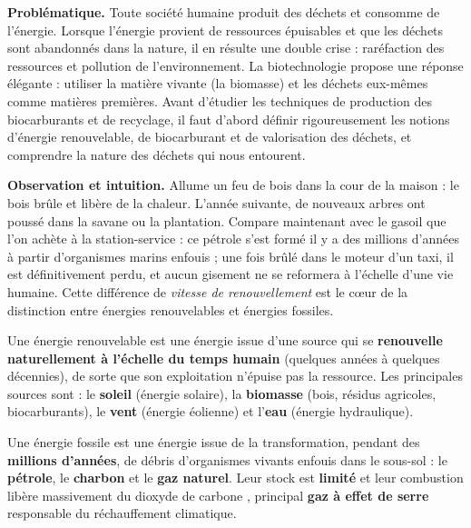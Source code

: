 \documentclass[11pt]{article}
\newcommand{\cle}[1]{{\popxbold\color{popdark}#1}}
\newcounter{popsec}
\newcounter{popsub}
\newcommand{\courssub}[1]{%
  \stepcounter{popsub}%
  \par\vspace{9pt}\noindent{\popxbold\fontsize{11.5}{13}\selectfont\color{popink}{\color{poporange}\thepopsec.\thepopsub}\hspace{6pt}#1}\par\nopagebreak\vspace{4pt}
}
\begin{document}
\textbf{Problématique.} Toute société humaine produit des déchets et consomme de l'énergie. Lorsque l'énergie provient de ressources épuisables et que les déchets sont abandonnés dans la nature, il en résulte une double crise : raréfaction des ressources et pollution de l'environnement. La biotechnologie propose une réponse élégante : utiliser la matière vivante (la \cle{biomasse}) et les déchets eux-mêmes comme matières premières. Avant d'étudier les techniques de production des biocarburants et de recyclage, il faut d'abord définir rigoureusement les notions d'énergie renouvelable, de biocarburant et de valorisation des déchets, et comprendre la nature des déchets qui nous entourent.

\courssub{Les énergies renouvelables}

\textbf{Observation et intuition.} Allume un feu de bois dans la cour de la maison : le bois brûle et libère de la chaleur. L'année suivante, de nouveaux arbres ont poussé dans la savane ou la plantation. Compare maintenant avec le gasoil que l'on achète à la station-service : ce pétrole s'est formé il y a des millions d'années à partir d'organismes marins enfouis ; une fois brûlé dans le moteur d'un taxi, il est définitivement perdu, et aucun gisement ne se reformera à l'échelle d'une vie humaine. Cette différence de \emph{vitesse de renouvellement} est le cœur de la distinction entre énergies renouvelables et énergies fossiles.

\begin{definition}
Une \cle{énergie renouvelable} est une énergie issue d'une source qui se \textbf{renouvelle naturellement à l'échelle du temps humain} (quelques années à quelques décennies), de sorte que son exploitation n'épuise pas la ressource. Les principales sources sont : le \textbf{soleil} (énergie solaire), la \textbf{biomasse} (bois, résidus agricoles, biocarburants), le \textbf{vent} (énergie éolienne) et l'\textbf{eau} (énergie hydraulique).
\end{definition}

\begin{definition}
Une \cle{énergie fossile} est une énergie issue de la transformation, pendant des \textbf{millions d'années}, de débris d'organismes vivants enfouis dans le sous-sol : le \textbf{pétrole}, le \textbf{charbon} et le \textbf{gaz naturel}. Leur stock est \textbf{limité} et leur combustion libère massivement du dioxyde de carbone , principal \textbf{gaz à effet de serre} responsable du réchauffement climatique.
\end{definition}
\end{document}
